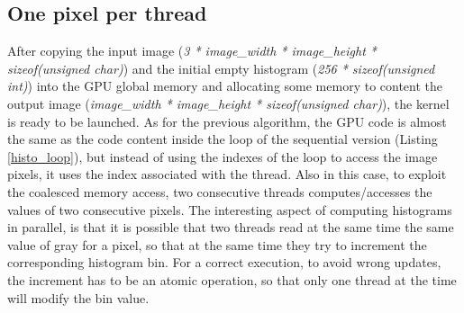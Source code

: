 \documentclass[a4paper]{article}
\begin{document}
\subsection{One pixel per thread}
\label{sec:fm2}
After copying the input image (\textit{3 * image\_width * image\_height * sizeof(unsigned char)}) and the initial empty histogram (\textit{256 * sizeof(unsigned int)}) into the GPU global memory and allocating some memory to content the output image (\textit{image\_width * image\_height * sizeof(unsigned char)}), the kernel is ready to be launched. As for the previous algorithm, the GPU code is almost the same as the code content inside the loop of the sequential version (Listing \ref{histo_loop}), but instead of using the indexes of the loop to access the image pixels, it uses the index associated with the thread. Also in this case, to exploit the coalesced memory access, two consecutive threads computes/accesses the values of two consecutive pixels. The interesting aspect of computing histograms in parallel, is that it is possible that two threads read at the same time the same value of gray for a pixel, so that at the same time they try to increment the corresponding histogram bin. For a correct execution, to avoid wrong updates, the increment has to be an atomic operation, so that only one thread at the time will modify the bin value. 
\end{document}
